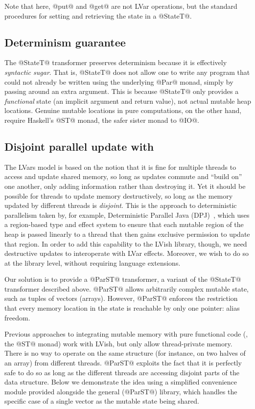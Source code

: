 Note that here, @put@ and @get@ are not LVar operations, but the
standard procedures for setting and retrieving the state in a
@StateT@.

\subsection{Determinism guarantee}

The @StateT@ transformer preserves determinism because it is
effectively \emph{syntactic sugar}.  That is, @StateT@ does not allow
one to write any program that could not already be written using the
underlying @Par@ monad, simply by passing around an extra argument.
This is because @StateT@ only provides a \emph{functional} state (an
implicit argument and return value), not actual mutable heap
locations.  Genuine mutable locations in pure computations, on the
other hand, require Haskell's @ST@ monad, the safer sister monad to
@IO@.

\subsection{Disjoint parallel update with }

The LVars model is based on the notion that it is fine for multiple
threads to access and update shared memory, so long as updates commute
and ``build on'' one another, only adding information rather than
destroying it.  Yet it should be possible for threads to update memory
destructively, so long as the memory updated by different threads is
\emph{disjoint}.  This is the approach to deterministic parallelism
taken by, for example, Deterministic Parallel Java
(DPJ)~\cite{dpj-oopsla}, which uses a region-based type and effect
system to ensure that each mutable region of the heap is passed
linearly to a thread that then gains exclusive permission to update
that region.  In order to add this capability to the LVish library,
though, we need destructive updates to interoperate with LVar effects.
Moreover, we wish to do so at the library level, without requiring
language extensions.

Our solution is to provide a @ParST@ transformer, a variant of the
@StateT@ transformer described above.  @ParST@ allows arbitrarily
complex mutable state, such as tuples of vectors (arrays).  However,
@ParST@ enforces the restriction that {every} memory location in the
state is reachable by only one pointer: alias freedom.

Previous approaches to integrating mutable memory with pure functional
code (\ie, the @ST@ monad) work with LVish, but only allow
thread-private memory.  There is no way to operate on the same
structure (for instance, on two halves of an array) from different
threads.  @ParST@ exploits the fact that it is perfectly safe to do so
as long as the different threads are accessing disjoint parts of the
data structure.  Below we demonstrate the idea using a simplified
convenience module provided alongside the general (@ParST@) library,
which handles the specific case of a single vector as the mutable
state being shared.

